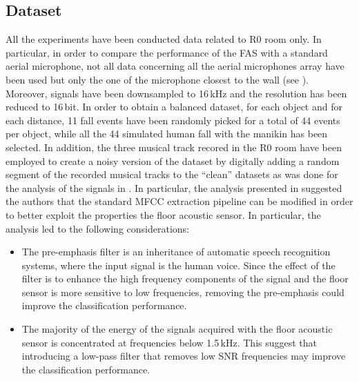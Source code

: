 %

\subsection{Dataset}
\label{sec:dataset_svm_multiclass}
All the experiments have been conducted data related to R0 room only. In particular, in order to compare the performance of the FAS with a standard aerial microphone, not all data concerning all the aerial microphones array have been used but only the one of the microphone closest to the wall (see ). Moreover, signals have been downsampled to 16\,kHz and the resolution has been reduced to 16\,bit. In order to obtain a balanced dataset, for each object and
for each distance, 11 fall events have been randomly picked for a total of 44 events per
object, while all the 44 simulated human fall with the manikin has been selected. In addition, the three musical track recored in the R0 room have been employed to create a noisy version of
the dataset by digitally adding a random segment of the recorded musical tracks
to the ``clean'' datasets as was done for the analysis of the signals in . In particular, the analysis presented in  suggested the authors that the standard MFCC extraction pipeline can be modified in order to better exploit the properties the floor acoustic sensor. In particular, the analysis led to the following considerations:
\begin{itemize}
	\item The pre-emphasis filter is an inheritance of automatic speech recognition systems, where the input signal is the human voice. Since the effect of the filter is to enhance the high frequency components of the signal and the floor sensor is more sensitive to low frequencies, removing the pre-emphasis could improve the classification performance.
	\item The majority of the energy of the signals acquired with the floor acoustic sensor is concentrated at frequencies below 1.5\,kHz. This suggest that introducing a low-pass filter that removes low SNR frequencies may improve the classification performance.
\end{itemize}
